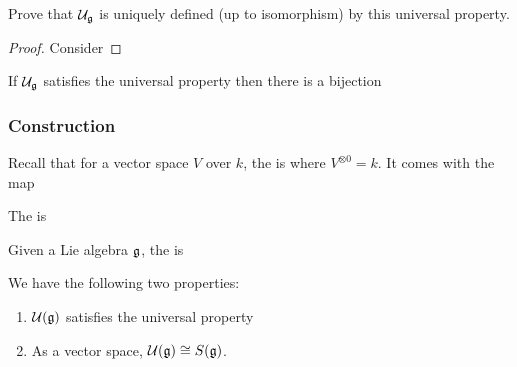 \documentclass{article}
\begin{document}
\begin{ex}
Prove that $\mathcal{U}_{\mathfrak{g}}$ is uniquely defined (up to isomorphism) by this universal property. 
\end{ex}
\begin{proof}
Consider
\end{proof}

\begin{prop}
If $\mathcal{U}_{\mathfrak{g}}$ satisfies the universal property then there is a bijection 
\end{prop}

\subsubsection{Construction}

\begin{definition}
Recall that for a vector space $V$ over $k$, the  is 
where $V^{\otimes 0}=k$. It comes with the map 
\end{definition}

\begin{definition}
The  is 
\end{definition}

\begin{definition}
Given a Lie algebra $\mathfrak{g}$, the  is 
\end{definition}

\begin{theorem}
We have the following two properties: 
\begin{enumerate}
    \item $\mathcal{U}(\mathfrak{g})$ satisfies the universal property 
    \item As a vector space, $\mathcal{U}(\mathfrak{g}) \cong S(\mathfrak{g})$. 
\end{enumerate}
\end{theorem}
\end{document}
